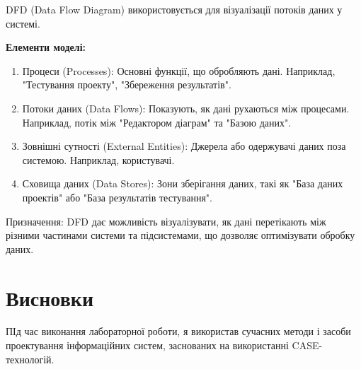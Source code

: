 \documentclass[oneside,14pt]{extarticle}
\begin{document}
\begin{normalsize}
	DFD (Data Flow Diagram) використовується для візуалізації потоків даних у системі.
	
	\textbf{Елементи моделі:}
	\begin{enumerate}
		\item Процеси (Processes): Основні функції, що обробляють дані. Наприклад, "Тестування проекту", "Збереження результатів".
		\item Потоки даних (Data Flows): Показують, як дані рухаються між процесами. Наприклад, потік між "Редактором діаграм" та "Базою даних".
		\item Зовнішні сутності (External Entities): Джерела або одержувачі даних поза системою. Наприклад, користувачі.
		\item Сховища даних (Data Stores): Зони зберігання даних, такі як "База даних проектів" або "База результатів тестування".
	\end{enumerate}
	Призначення:
	DFD дає можливість візуалізувати, як дані перетікають між різними частинами системи та підсистемами, що дозволяє оптимізувати обробку даних.
	
	
	\section*{Висновки}
	ПІд час виконання лабораторної роботи, я використав сучасних методи і засоби проектування інформаційних систем, заснованих на використанні CASE-технологій.
	    
\end{normalsize}
\end{document}
